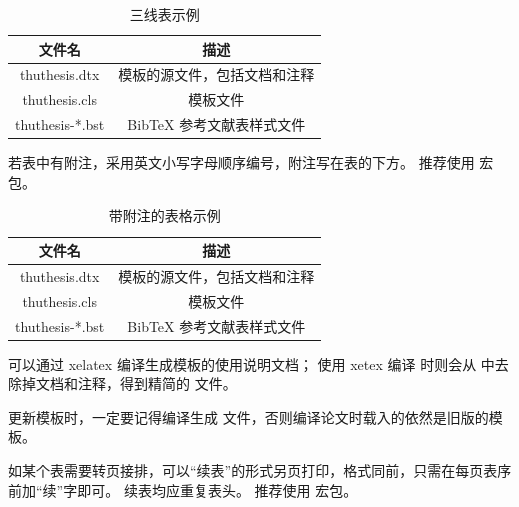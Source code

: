 \begin{table}
  \centering
  \caption{三线表示例}
  \begin{tabular}{cc}
    \toprule
    文件名          & 描述                         \\
    \midrule
    thuthesis.dtx   & 模板的源文件，包括文档和注释 \\
    thuthesis.cls   & 模板文件                     \\
    thuthesis-*.bst & BibTeX 参考文献表样式文件    \\
    \bottomrule
  \end{tabular}
  \label{tab:three-line}
\end{table}

若表中有附注，采用英文小写字母顺序编号，附注写在表的下方。
推荐使用  宏包。

\begin{table}
  \centering
  \begin{threeparttable}[c]
    \caption{带附注的表格示例}
    \label{tab:three-part-table}
    \begin{tabular}{cc}
      \toprule
      文件名                 & 描述                         \\
      \midrule
      thuthesis.dtx\tnote{a} & 模板的源文件，包括文档和注释 \\
      thuthesis.cls\tnote{b} & 模板文件                     \\
      thuthesis-*.bst        & BibTeX 参考文献表样式文件    \\
      \bottomrule
    \end{tabular}
    \begin{tablenotes}
      \item [a] 可以通过 xelatex 编译生成模板的使用说明文档；
        使用 xetex 编译  时则会从  中去除掉文档和注释，得到精简的  文件。
      \item [b] 更新模板时，一定要记得编译生成  文件，否则编译论文时载入的依然是旧版的模板。
    \end{tablenotes}
  \end{threeparttable}
\end{table}

如某个表需要转页接排，可以“续表”的形式另页打印，格式同前，只需在每页表序前加“续”字即可。
续表均应重复表头。
推荐使用  宏包。

